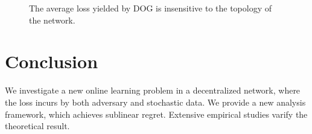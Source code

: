 \documentclass{article}
\begin{document}
\begin{figure}[!h]
\caption{The average loss yielded by DOG is insensitive to the topology of the network.}
\label{figure_compare_topology}
\end{figure}




\section{Conclusion}
We investigate a new online learning problem in a decentralized network, where the loss incurs by both adversary and stochastic data.  We provide a new analysis framework, which achieves sublinear regret. Extensive empirical studies varify the theoretical result. 





\end{document}
